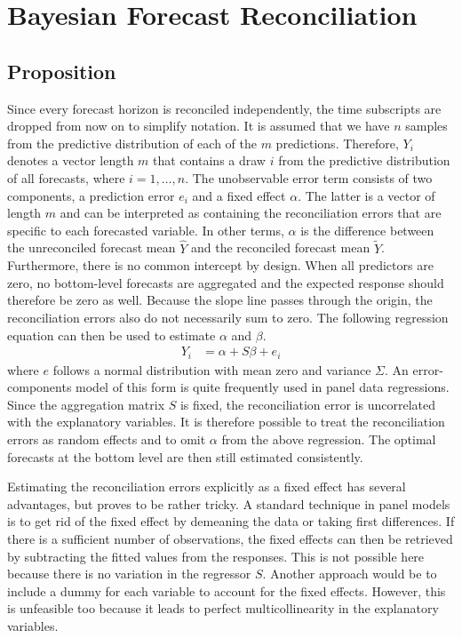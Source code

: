 \documentclass[a4paper,fleqn,11pt]{article}
\begin{document}
\section{Bayesian Forecast Reconciliation}
\subsection{Proposition}
Since every forecast horizon is reconciled independently, the time subscripts are dropped from now on to simplify notation. It is assumed that we have $n$ samples from the predictive distribution of each of the $m$ predictions. Therefore, $Y_{i}$ denotes a vector length $m$ that contains a draw $i$ from the predictive distribution of all forecasts, where $i = 1,\hdots, n$. The unobservable error term consists of two components, a prediction error $e_{i}$ and a fixed effect $\alpha$. The latter is a vector of length $m$ and can be interpreted as containing the reconciliation errors that are specific to each forecasted variable. In other terms, $\alpha$ is the difference between the unreconciled forecast mean $\hat{Y}$ and the reconciled forecast mean $\tilde{Y}$. Furthermore, there is no common intercept by design. When all predictors are zero, no bottom-level forecasts are aggregated and the expected response should therefore be zero as well. Because the slope line passes through the origin, the reconciliation errors also do not necessarily sum to zero. The following regression equation can then be used to estimate $\alpha$ and $\beta$.
\begin{align}
Y_{i} &= \alpha + S\beta + e_{i}
\end{align}
where $e$ follows a normal distribution with mean zero and variance $\Sigma$. An error-components model of this form is quite frequently used in panel data regressions. Since the aggregation matrix $S$ is fixed, the reconciliation error is uncorrelated with the explanatory variables. It is therefore possible to treat the reconciliation errors as random effects and to omit $\alpha$ from the above regression. The optimal forecasts at the bottom level are then still estimated consistently. 

Estimating the reconciliation errors explicitly as a fixed effect has several advantages, but proves to be rather tricky. A standard technique in panel models is to get rid of the fixed effect by demeaning the data or taking first differences. If there is a sufficient number of observations, the fixed effects can then be retrieved by subtracting the fitted values from the responses. This is not possible here because there is no variation in the regressor $S$. Another approach would be to include a dummy for each variable to account for the fixed effects. However, this is unfeasible too because it leads to perfect multicollinearity in the explanatory variables.
\end{document}
